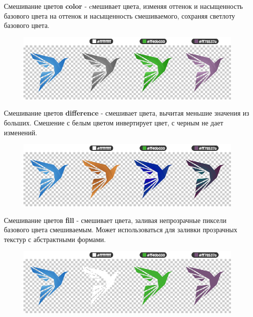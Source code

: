 \documentclass[aspectration=1610,t]{beamer}
\begin{document}
\begin{frame}[fragile]{Смешивание цветов}
    {\bf color} - cмешивает цвета, изменяя оттенок и насыщенность базового цвета на оттенок и 
    насыщенность смешиваемого, сохраняя светлоту базового цвета.
    \begin{figure}[htp]
        \centering
        \includegraphics[scale=0.40]{res/color}
    \end{figure}
\end{frame}

\begin{frame}[fragile]{Смешивание цветов}
    {\bf difference} - смешивает цвета, вычитая меньшие значения из больших. 
    Смешение с белым цветом инвертирует цвет, с черным не дает изменений.
    \begin{figure}[htp]
        \centering
        \includegraphics[scale=0.40]{res/difference}
    \end{figure}
\end{frame}

\begin{frame}[fragile]{Смешивание цветов}
    {\bf fill} - смешивает цвета, заливая непрозрачные пиксели базового цвета смешиваемым.
    Может использоваться для заливки прозрачных текстур с абстрактными формами.
    \begin{figure}[htp]
        \centering
        \includegraphics[scale=0.40]{res/fill}
    \end{figure}
\end{frame}
\end{document}

